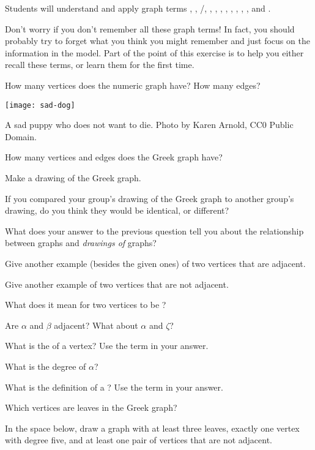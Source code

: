 \documentclass{tufte-handout}
\begin{document}
\begin{objective}
  Students will understand and apply graph terms ,
  , /, , ,
  , , ,
  , , , and .
\end{objective}

Don't worry if you don't remember all these graph terms!  In fact, you
should probably try to forget what you think you might remember and
just focus on the information in the model. Part of the point of this
exercise is to help you either recall these terms, or learn them for
the first time.

\begin{questions}
\item How many vertices does the numeric graph have?  How many edges?
   \medskip
  \begin{marginfigure}
    \begin{center}
      \texttt{[image: sad-dog]}
      \caption{A sad puppy who does not want to die. Photo by Karen
        Arnold, CC$0$ Public Domain.}
    \end{center}
  \end{marginfigure}
\item How many vertices and edges does the Greek graph have?
\item Make a drawing of the Greek graph.
\item If you compared your group's drawing of the Greek graph to
  another group's drawing, do you think they would be identical, or
  different?
\item What does your answer to the previous question tell you about
  the relationship between graphs and \emph{drawings of} graphs?
\item Give another example (besides the given ones) of two vertices
  that are adjacent.
\item Give another example of two vertices that are not adjacent.
\item What does it mean for two vertices to be ?
  \newpage
\item Are $\alpha$ and $\beta$ adjacent?   What about $\alpha$ and $\zeta$?
\item What is the  of a vertex?  Use the term
   in your answer.
\item What is the degree of $\alpha$?
\item What is the definition of a ?  Use the term
   in your answer.
\item Which vertices are leaves in the Greek graph?
\item In the space below, draw a graph with at least three leaves,
  exactly one vertex with degree five, and at least one pair of
  vertices that are not adjacent.
\end{questions}
\end{document}
